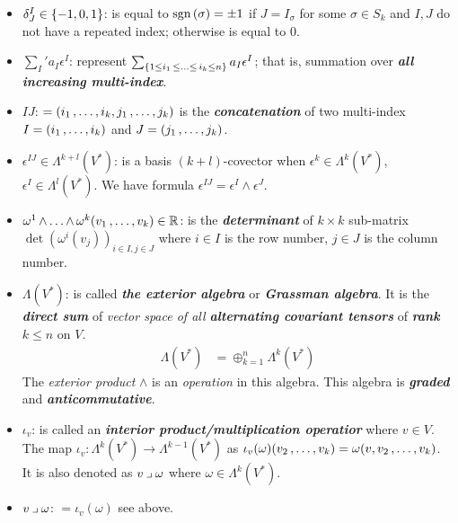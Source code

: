 \documentclass[11pt]{article}
\begin{document}
\begin{itemize}
\item $\delta_{J}^{I} \in \left\{-1, 0, 1\right\}$: \quad is equal to $\text{sgn}\left(\sigma\right) = \pm 1$ if $J = I_{\sigma}$ for some $\sigma \in S_k$ and $I, J$ do not have a repeated index; otherwise is equal to $0$.

\item $\sum_{I}' a_{I} \epsilon^I$: \quad represent $\sum_{\left\{1 \le i_1 \,{\le}\ldots{\le}\, i_k \le n\right\}} a_{I} \epsilon^I$; that is, summation over \emph{\textbf{all increasing multi-index}}.

\item $IJ$: \quad $= (i_1 \,{,}\ldots{,}\, i_k, j_1 \,{,}\ldots{,}\, j_k)$ is the \emph{\textbf{concatenation}} of two multi-index $I = (i_1 \,{,}\ldots{,}\, i_k)$ and $J = (j_1 \,{,}\ldots{,}\, j_k)$.

\item $\epsilon^{IJ}  \in \Lambda^{k+l}(V^{*})$: \quad is a basis $(k+l)$-covector when $\epsilon^{k} \in \Lambda^{k}(V^{*})$, $\epsilon^{I} \in \Lambda^{l}(V^{*})$. We have formula $\epsilon^{IJ} = \epsilon^{I} \wedge \epsilon^{J}$.

\item $\omega^1 \,{\wedge}\ldots{\wedge}\, \omega^k (v_1 \,{,}\ldots{,}\, v_k) \in {\mathbb R}$: \quad is the \emph{\textbf{determinant}} of $k\times k$ sub-matrix $\det(\omega^{i}(v_j))_{i\in I, j \in J}$ where $i\in I$ is the row number, $j \in J$ is the column number.

\item $\Lambda(V^{*})$: \quad is called \emph{\textbf{the exterior algebra}} or \emph{\textbf{Grassman algebra}}. It is the \emph{\textbf{direct sum}} of  \emph{vector space of all \textbf{alternating covariant tensors}} of \emph{\textbf{rank}} $k \le n$ on $V$.
\begin{align*}
\Lambda(V^{*}) &= \oplus_{k=1}^{n}\Lambda^{k}(V^{*})
\end{align*} The \emph{exterior product} $\wedge$ is an \emph{operation} in this algebra. This algebra is \emph{\textbf{graded}} and \emph{\textbf{anticommutative}}.

\item $\iota_{v}$: \quad is called an \emph{\textbf{interior product/multiplication operatior}} where $v \in V$. The map $\iota_{v}: \Lambda^{k}(V^{*}) \rightarrow \Lambda^{k-1}(V^{*})$ as $\iota_v(\omega)(v_2 \,{,}\ldots{,}\, v_k) = \omega(v, v_2 \,{,}\ldots{,}\, v_k)$. It is also denoted as $v \mathbin{\lrcorner }{\omega}$ where $\omega \in \Lambda^{k}(V^{*})$.

\item $v \mathbin{\lrcorner }{\omega}$: \quad $= \iota_v(\omega)$ see above. 


\end{itemize}
\end{document}
